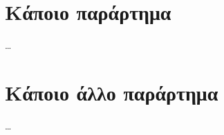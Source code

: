 \documentclass[report.tex]{subfiles}
\begin{document}
\begin{myappendices}

\clearpage
\setcounter{figure}{0}
\section{Κάποιο παράρτημα}%
\label{app:some_appendix}

\ldots

\clearpage
\setcounter{figure}{0}
\section{Κάποιο άλλο παράρτημα}%
\label{app:some_other_appendix}

\ldots

\end{myappendices}





\end{document}
